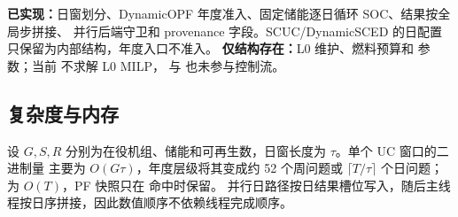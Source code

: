 \begin{gapnote}
\textbf{已实现：}日窗划分、DynamicOPF 年度准入、固定储能逐日循环 SOC、结果按全局步拼接、
并行后端守卫和 provenance 字段。SCUC/DynamicSCED 的日配置只保留为内部结构，年度入口不准入。
\textbf{仅结构存在：}L0 维护、燃料预算和
 参数；当前  不求解 L0 MILP，
 与  也未参与控制流。
\end{gapnote}

\subsection{复杂度与内存}
设 $G,S,R$ 分别为在役机组、储能和可再生数，日窗长度为 $\tau$。单个 UC 窗口的二进制量
主要为 $O(G\tau)$，年度层级将其变成约 52 个周问题或 $\lceil T/\tau\rceil$ 个日问题；
 为 $O(T)$，PF 快照只在  命中时保留。
并行日路径按日结果槽位写入，随后主线程按日序拼接，因此数值顺序不依赖线程完成顺序。
